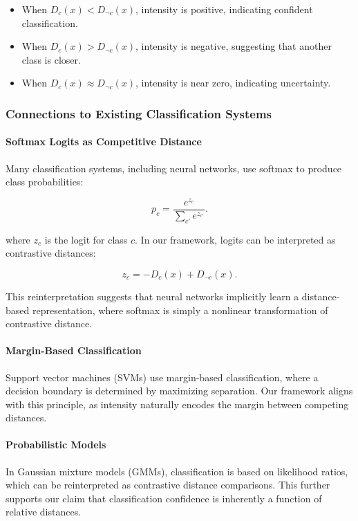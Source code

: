 \begin{itemize}
    \item When \( D_c(x) < D_{\neg c}(x) \), intensity is positive, indicating confident classification.
    \item When \( D_c(x) > D_{\neg c}(x) \), intensity is negative, suggesting that another class is closer.
    \item When \( D_c(x) \approx D_{\neg c}(x) \), intensity is near zero, indicating uncertainty.
\end{itemize}

\subsubsection{Connections to Existing Classification Systems}

\paragraph{Softmax Logits as Competitive Distance}
Many classification systems, including neural networks, use softmax to produce class probabilities:

\[
p_c = \frac{e^{z_c}}{\sum_{c'} e^{z_{c'}}}.
\]

where \( z_c \) is the logit for class \( c \). In our framework, logits can be interpreted as contrastive distances:

\[
z_c = -D_c(x) + D_{\neg c}(x).
\]

This reinterpretation suggests that neural networks implicitly learn a distance-based representation, where softmax is simply a nonlinear transformation of contrastive distance.

\paragraph{Margin-Based Classification}
Support vector machines (SVMs) use margin-based classification, where a decision boundary is determined by maximizing separation. Our framework aligns with this principle, as intensity naturally encodes the margin between competing distances.

\paragraph{Probabilistic Models}
In Gaussian mixture models (GMMs), classification is based on likelihood ratios, which can be reinterpreted as contrastive distance comparisons. This further supports our claim that classification confidence is inherently a function of relative distances.

